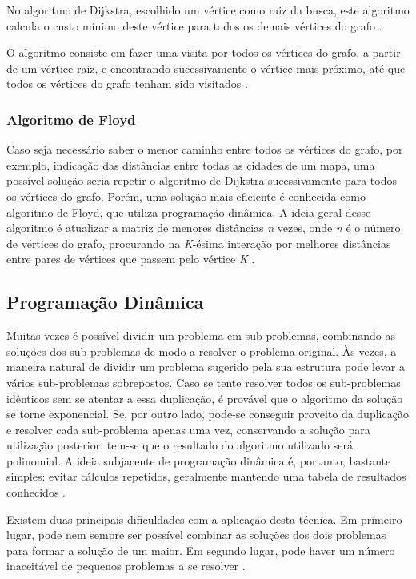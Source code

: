 No algoritmo de Dijkstra, escolhido um vértice como raiz da busca, este algoritmo calcula o custo mínimo deste vértice para todos os demais vértices do grafo \cite{Cormen:2001}.

O algoritmo consiste em fazer uma visita por todos os vértices do grafo, a partir de um vértice raiz, e encontrando sucessivamente o vértice mais próximo, até que todos os vértices do grafo tenham sido visitados \cite{Cormen:2001}.

\subsubsection{Algoritmo de Floyd}

Caso seja necessário saber o menor caminho entre todos os vértices do grafo, por exemplo, indicação das distâncias entre todas as cidades de um mapa, uma possível solução seria repetir o algoritmo de Dijkstra sucessivamente para todos os vértices do grafo. Porém, uma solução mais eficiente é conhecida como algoritmo de Floyd, que utiliza programação dinâmica. A ideia geral desse algoritmo é atualizar a matriz de menores distâncias \textit{n} vezes, onde \textit{n} é o número de vértices do grafo, procurando na \textit{K}-ésima interação por melhores distâncias entre pares de vértices que passem pelo vértice \textit{K} \cite{Sampaio:2005}.

\subsection{Programação Dinâmica}

Muitas vezes é possível dividir um problema em sub-problemas, combinando as soluções dos sub-problemas de modo a resolver o problema original. Às vezes, a maneira natural de dividir um problema sugerido pela sua estrutura pode levar a vários sub-problemas sobrepostos. Caso se tente resolver todos os sub-problemas idênticos sem se atentar a essa duplicação, é provável que o algoritmo da solução se torne exponencial. Se, por outro lado, pode-se conseguir proveito da duplicação e resolver cada sub-problema apenas uma vez, conservando a solução para utilização posterior, tem-se que o resultado do algoritmo utilizado será polinomial. A ideia subjacente de programação dinâmica é, portanto, bastante simples: evitar cálculos repetidos, geralmente mantendo uma tabela de resultados conhecidos \cite{Aho:1983}.

Existem duas principais dificuldades com a aplicação desta técnica. Em primeiro lugar, pode nem sempre ser possível combinar as soluções dos dois problemas para formar a solução de um maior. Em segundo lugar, pode haver um número inaceitável de pequenos problemas a se resolver \cite{Sedgewick:2011}.

